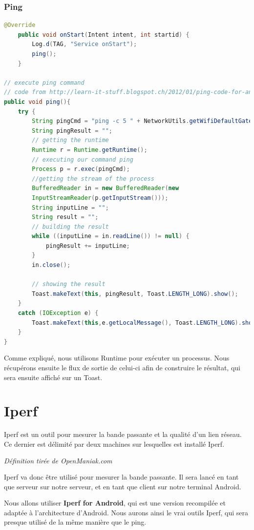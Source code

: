 \subsubsection{Ping}
\begin{lstlisting}[language=Java, caption={Code du ping}]
@Override
	public void onStart(Intent intent, int startid) {
		Log.d(TAG, "Service onStart");
		ping();
	}

// execute ping command
// code from http://learn-it-stuff.blogspot.ch/2012/01/ping-code-for-android-activity.html
public void ping(){
	try {
		String pingCmd = "ping -c 5 " + NetworkUtils.getWifiDefaultGateway();
		String pingResult = "";
		// getting the runtime
		Runtime r = Runtime.getRuntime();
		// executing our command ping
		Process p = r.exec(pingCmd);
		//getting the stream of the process
		BufferedReader in = new BufferedReader(new
		InputStreamReader(p.getInputStream()));
		String inputLine = "";
		String result = "";
		// building the result
		while ((inputLine = in.readLine()) != null) {
			pingResult += inputLine;
		}
		in.close();
		
		// showing the result
		Toast.makeText(this, pingResult, Toast.LENGTH_LONG).show();
	}
	catch (IOException e) {
		Toast.makeText(this,e.getLocalMessage(), Toast.LENGTH_LONG).show();
	}
}
\end{lstlisting}

Comme expliqué, nous utilisons Runtime pour exécuter un processus. Nous récupérons ensuite le flux de sortie de celui-ci afin de construire le résultat, qui sera ensuite affiché sur un Toast.
\section{Iperf}
\begin{shadequote}
Iperf est un outil pour mesurer la bande passante et la qualité d'un lien réseau. Ce dernier est délimité par deux machines sur lesquelles est installé Iperf.
\par\emph{Définition tirée de OpenManiak.com}
\end{shadequote}

Iperf va donc être utilisé pour mesurer la bande passante. Il sera lancé en tant que serveur sur notre serveur, et en tant que client sur notre terminal Android.

\medskip

Nous allons utiliser \textbf{Iperf for Android}, qui est une version recompilée et adaptée à l'architecture d'Android. Nous aurons ainsi le vrai outils Iperf, qui sera presque utilisé de la même manière que le ping.

